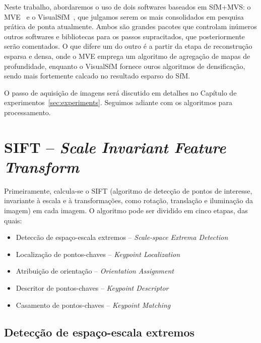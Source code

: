 Neste trabalho, abordaremos o uso de dois softwares baseados em SfM+MVS: o
MVE~\cite{mve} e o VisualSfM~\cite{wu2011visualsfm}, que julgamos serem os mais
consolidados em pesquisa prática de ponta atualmente. Ambos são grandes pacotes
que controlam inúmeros outros softwares e bibliotecas para os passos
supracitados, que posteriormente serão comentados. O que difere um do outro é a
partir da etapa de reconstrução esparsa e densa, onde o MVE emprega um algoritmo
de agregação de mapas de profundidade, enquanto o VisualSfM fornece ouros
algoritmos de densificação, sendo mais fortemente calcado no resultado esparso do SfM.

O passo de aquisição de imagens será discutido em detalhes no Capítulo de
experimentos~\ref{sec:experiments}. Seguimos adiante com os algoritmos para
processamento.

\section*{SIFT -- \emph{Scale Invariant Feature Transform}}

Primeiramente, calcula-se o SIFT (algoritmo de detecção de pontos de interesse,
invariante à escala e à transformações, como rotação, translação e iluminação da
imagem) em cada imagem.
O algoritmo pode ser dividido em cinco etapas, das quais:

\begin{itemize}
	\item{Deteccão de espaço-escala extremos -- \emph{Scale-space Extrema Detection}}
	\item{Localização de pontos-chaves -- \emph{Keypoint Localization}}
	\item{Atribuição de orientação -- \emph{Orientation Assignment}}
	\item{Descritor de pontos-chaves -- \emph{Keypoint Descriptor}}
	\item{Casamento de pontos-chaves -- \emph{Keypoint Matching}}
\end{itemize}


\subsection*{Detecção de espaço-escala extremos}\label{DiffGaussian}


